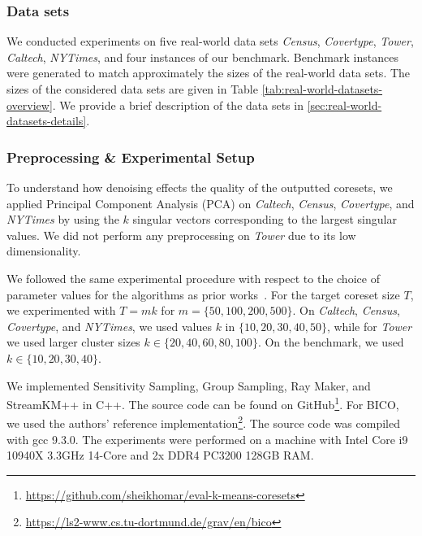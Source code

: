 \subsubsection*{Data sets}
We conducted experiments on five real-world data sets
\textit{Census},
\textit{Covertype},
\textit{Tower},
\textit{Caltech},
\textit{NYTimes},
and four instances of our benchmark. Benchmark instances were generated to match approximately the sizes of the real-world data sets. 
The sizes of the considered data sets are given in Table \ref{tab:real-world-datasets-overview}.
We provide a brief description of the data sets in \cref{sec:real-world-datasets-details}.


\subsubsection*{Preprocessing \& Experimental Setup}
To understand how denoising effects the quality of the outputted coresets, we applied Principal Component Analysis (PCA) on \textit{Caltech}, \textit{Census}, \textit{Covertype}, and \textit{NYTimes} by using the $k$ singular vectors corresponding to the largest singular values. 
We did not perform any preprocessing on \textit{Tower} due to its low dimensionality.

We followed the same experimental procedure with respect to the choice of parameter values for the algorithms as prior works~\cite{AckermannMRSLS12, FGSSS13}. For the target coreset size $T$, we experimented with $T=mk$ for $m = \{50, 100, 200, 500\}$. On \textit{Caltech}, \textit{Census},  \textit{Covertype}, and \textit{NYTimes}, we used values $k$ in $\{10, 20, 30, 40, 50\}$, while for \textit{Tower} we used larger cluster sizes $k \in \{20, 40, 60, 80, 100\}$. On the benchmark, we used  $k \in \{10, 20, 30, 40\}$.


We implemented Sensitivity Sampling, Group Sampling, Ray Maker, and StreamKM++ in C++. The source code can be found on GitHub\footnote{\url{https://github.com/sheikhomar/eval-k-means-coresets}}. For BICO, we used the authors' reference implementation\footnote{\url{https://ls2-www.cs.tu-dortmund.de/grav/en/bico}}. The source code was compiled with gcc 9.3.0. The experiments were performed on a machine with Intel Core i9 10940X 3.3GHz 14-Core and 2x DDR4 PC3200 128GB RAM.



